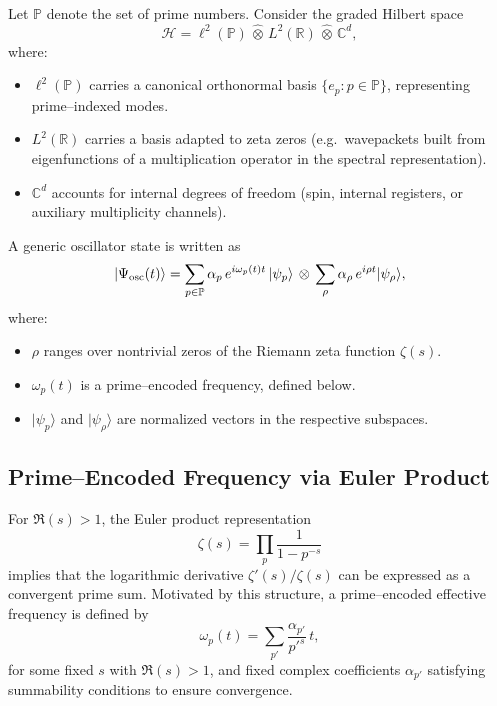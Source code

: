 \documentclass[11pt]{article}
\begin{document}
Let \(\mathbb{P}\) denote the set of prime numbers. Consider the graded Hilbert space
\[
  \mathcal{H}
  = \ell^2(\mathbb{P}) \,\widehat{\otimes}\, L^2(\mathbb{R}) \,\widehat{\otimes}\, \mathbb{C}^d,
\]
where:
\begin{itemize}
  \item \(\ell^2(\mathbb{P})\) carries a canonical orthonormal basis \(\{ e_p : p \in \mathbb{P} \}\), representing prime–indexed modes.
  \item \(L^2(\mathbb{R})\) carries a basis adapted to zeta zeros (e.g.\ wavepackets built from eigenfunctions of a multiplication operator in the spectral representation).
  \item \(\mathbb{C}^d\) accounts for internal degrees of freedom (spin, internal registers, or auxiliary multiplicity channels).
\end{itemize}

A generic oscillator state is written as
\begin{equation}
  |\Psi_{\rm osc}(t)\rangle
  = \sum_{p\in\mathbb{P}} \alpha_p \, e^{i \omega_p(t) t} \,|\psi_p\rangle
    \,\otimes\, \sum_{\rho} \alpha_{\rho} \, e^{i \rho t}|\psi_{\rho}\rangle,
\end{equation}
where:
\begin{itemize}
  \item \(\rho\) ranges over nontrivial zeros of the Riemann zeta function \(\zeta(s)\).\cite{RHOverview,RZQC}
  \item \(\omega_p(t)\) is a prime–encoded frequency, defined below.
  \item \(|\psi_p\rangle\) and \(|\psi_{\rho}\rangle\) are normalized vectors in the respective subspaces.
\end{itemize}

\subsection{Prime–Encoded Frequency via Euler Product}

For \(\Re(s) > 1\), the Euler product representation
\begin{equation}
  \zeta(s) = \prod_{p} \frac{1}{1 - p^{-s}}
\end{equation}
implies that the logarithmic derivative \(\zeta'(s)/\zeta(s)\) can be expressed as a convergent prime sum.\cite{RHOverview}
Motivated by this structure, a prime–encoded effective frequency is defined by
\begin{equation}
  \omega_p(t)
  = \sum_{p'} \frac{\alpha_{p'}}{{p'}^s} \, t,
\end{equation}
for some fixed \(s\) with \(\Re(s) > 1\), and fixed complex coefficients \(\alpha_{p'}\) satisfying summability conditions to ensure convergence.
\end{document}
